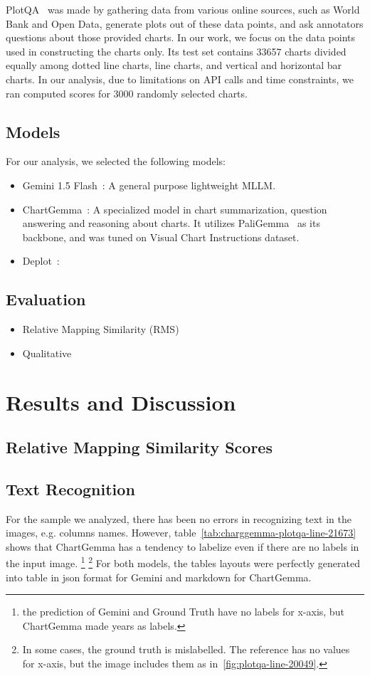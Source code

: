 \documentclass[
	letterpaper, %
]{jdf}
\begin{document}
PlotQA~\cite{methani2020plotqa} was made by gathering data from various online sources, such as World Bank and Open Data, generate plots out of these data points, and ask annotators questions about those provided charts.
In our work, we focus on the data points used in constructing the charts only.
Its test set contains 33657 charts divided equally among dotted line charts, line charts, and vertical and horizontal bar charts.
In our analysis, due to limitations on API calls and time constraints, we ran computed scores for 3000 randomly selected charts.

\subsection{Models}\label{ssect:models}
For our analysis, we selected the following models:
\begin{itemize}
  \item Gemini 1.5 Flash~\cite{team2024gemini}: A general purpose lightweight MLLM.
     \item ChartGemma~\cite{masry2024chartgemma}: A specialized model in chart summarization, question answering and reasoning about charts.
       It utilizes PaliGemma~\cite{beyer2024paligemma} as its backbone, and was tuned on Visual Chart Instructions dataset.
     \item Deplot~\cite{liu2022deplot}: 
       \end{itemize}
\subsection{Evaluation}
\begin{itemize}
  \item Relative Mapping Similarity (RMS)
  \item Qualitative
       \end{itemize}

\section{Results and Discussion}\label{sect:qualitative-analysis}
\subsection{Relative Mapping Similarity Scores}\label{ssect:rms}
\subsection{Text Recognition}\label{ssect:qualitative-text-recognition}
For the sample we analyzed, there has been no errors in recognizing text in the images, e.g. columns names.
However, table~\ref{tab:charggemma-plotqa-line-21673} shows that ChartGemma has a tendency to labelize even if there are no labels in the input image.
\footnote{the prediction of Gemini and Ground Truth have no labels for x-axis, but ChartGemma made years as labels.}
\footnote{In some cases, the ground truth is mislabelled. The reference has no values for x-axis, but the image includes them as in~\ref{fig:plotqa-line-20049}.}
For both models, the tables layouts were perfectly generated into table in json format for Gemini and markdown for ChartGemma.
\end{document}
